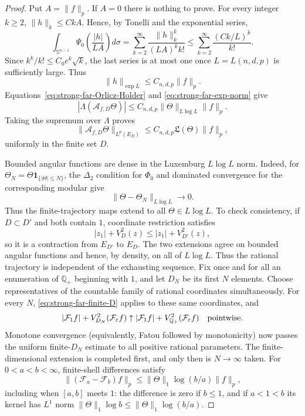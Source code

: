 \documentclass[11pt]{article}
\numberwithin{equation}{section}
\theoremstyle{remark}
\theoremstyle{definition}
\newcommand{\Sph}{\mathbb S}
\newcommand{\cF}{\mathcal F}
\newcommand{\norm}[1]{\lVert #1\rVert}
\begin{document}
\begin{proof}
Put $A=\norm f_p$.  If $A=0$ there is nothing to prove.  For every integer $k\geq2$,
$\norm h_k\leq CkA$.  Hence, by Tonelli and the exponential series,
\begin{equation}\label{eq:strong-far-exp-series}
 \int_{\Sph^{n-1}}\Psi_0\!\left(\frac{|h|}{LA}\right)d\sigma
 =\sum_{k=2}^\infty
 \frac{\norm h_k^k}{(LA)^k k!}
 \leq\sum_{k=2}^\infty\frac{(Ck/L)^k}{k!}.
\end{equation}
Since $k^k/k!\leq C_0e^k\sqrt{k}$, the last series is at most one once
$L=L(n,d,p)$ is sufficiently large.  Thus
\begin{equation}\label{eq:strong-far-exp-norm}
 \norm h_{\exp L}\leq C_{n,d,p}\norm f_p.
\end{equation}
Equations~\eqref{eq:strong-far-Orlicz-Holder} and
\eqref{eq:strong-far-exp-norm} give
\[
 |\Lambda(\mathcal A_{f,D}\Theta)|
 \leq C_{n,d,p}\norm\Theta_{L\log L}\norm f_p.
\]
Taking the supremum over $\Lambda$ proves
\begin{equation}\label{eq:strong-far-finite-D}
 \norm{\mathcal A_{f,D}\Theta}_{L^p(E_D)}
 \leq C_{n,d,p}\mathfrak L(\Theta)\norm f_p,
\end{equation}
uniformly in the finite set $D$.

Bounded angular functions are dense in the Luxemburg \(L\log L\) norm.
Indeed, for
$\Theta_N=\Theta\mathbf1_{\{|\Theta|\le N\}}$, the $\Delta_2$ condition
for $\Phi_0$ and dominated convergence for the corresponding modular give
\[
 \norm{\Theta-\Theta_N}_{L\log L}\longrightarrow0.
\]
Thus the finite-trajectory maps extend to all $\Theta\in L\log L$.  To
check consistency, if $D\subset D'$ and both contain $1$, coordinate
restriction satisfies
\[
 |z_1|+V_D^2(z)\le |z_1|+V_{D'}^2(z),
\]
so it is a contraction from $E_{D'}$ to $E_D$.  The two extensions agree
on bounded angular functions and hence, by density, on all of $L\log L$.
Thus the rational trajectory is independent of the exhausting sequence.
Fix once and for all an enumeration of $\mathbb Q_+$ beginning with $1$,
and let $D_N$ be its first $N$ elements.  Choose representatives of the
countable family of rational coordinates simultaneously.  For every $N$,
\eqref{eq:strong-far-finite-D} applies to these same coordinates, and
\[
 |\cF_1f|+V^2_{D_N}(\cF_\varepsilon f)
 \uparrow |\cF_1f|+V^2_{\mathbb Q_+}(\cF_\varepsilon f)
 \quad\hbox{pointwise}.
\]
Monotone convergence (equivalently, Fatou followed by monotonicity) now
passes the uniform finite-$D_N$ estimate to all positive rational
parameters.  The finite-dimensional extension is completed first, and
only then is $N\to\infty$ taken.  For $0<a<b<\infty$, finite-shell
differences satisfy
\begin{equation}\label{eq:strong-far-shell-continuity}
 \norm{(\cF_a-\cF_b)f}_p
 \leq \norm\Theta_1\log(b/a)\norm f_p,
\end{equation}
including when $[a,b]$ meets $1$: the difference is zero if $b\le1$, and
if $a<1<b$ its kernel has $L^1$ norm
$\norm\Theta_1\log b\le\norm\Theta_1\log(b/a)$.


\end{proof}
\end{document}
